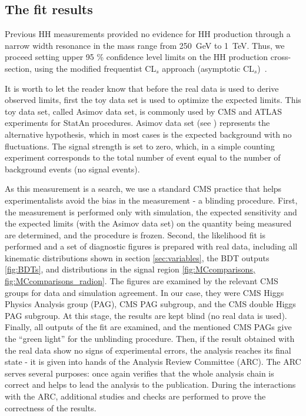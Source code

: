 \begin{small}
\subsection{The fit results}
\label{sec:fit_results}

Previous HH measurements provided no evidence for HH production through a narrow width resonance in the mass range from 250~GeV to 1~TeV. Thus, we proceed setting upper 95 \% confidence level limits on the HH production cross-section, using the modified frequentist CL$_s$ approach (asymptotic CL$_s$)~\cite{Junk:1999kv,LEP-CLs, HIG-11-011, Cowan:2010js}.

It is worth to let the reader know that before the real data is used to derive observed limits, first the toy data set is used to optimize the expected limits. This toy data set, called Asimov data set, is commonly used by CMS and ATLAS experiments for StatAn procedures. Asimov data set (see \cite{Cowan:2010js}) represents the alternative hypothesis, which in most cases is the expected background with no fluctuations. The signal strength is set to zero, which, in a simple counting experiment \cite{expected_limit_asimov} corresponds to the total number of event equal to the number of background events (no signal events). 

As this measurement is a search, we use a standard CMS practice that helps experimentalists avoid the bias in the measurement - a blinding procedure. First, the measurement is performed only with simulation, the expected sensitivity and the expected limits (with the Asimov data set) on the quantity being measured are determined, and the procedure is frozen. Second, the likelihood fit is performed and a set of diagnostic figures is prepared with real data, including all kinematic distributions shown in section \ref{sec:variables}, the BDT outputs \ref{fig:BDTs}, and \mTHH distributions in the signal region \ref{fig:MCcomparisons, fig:MCcomparisons_radion}. The figures are examined by the relevant CMS groups for data and simulation agreement. In our case, they were CMS Higgs Physics Analysis group (PAG), CMS \HZZ PAG subgroup, and the CMS double Higgs PAG subgroup. At this stage, the results are kept blind (no real data is used). Finally, all outputs of the fit are examined, and the mentioned CMS PAGs give the ``green light'' for the unblinding procedure. Then, if the result obtained with the real data show no signs of experimental errors, the analysis reaches its final state - it is given into hands of the Analysis Review Committee (ARC). The ARC serves several purposes: once again verifies that the whole analysis chain is correct and helps to lead the analysis to the publication. During the interactions with the ARC, additional studies and checks are performed to prove the correctness of the results. 


\end{small}
